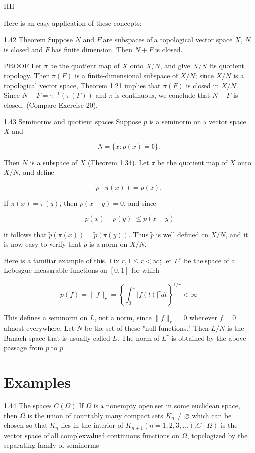 \documentclass[10pt]{article}
\begin{document}
IIII

Here is-an easy application of these concepts:

1.42 Theorem Suppose $N$ and $F$ are subspaces of a topological vector space $X$, $N$ is closed and $F$ has finite dimension. Then $N+F$ is closed.

PROOF Let $\pi$ be the quotient map of $X$ onto $X / N$, and give $X / N$ its quotient topology. Then $\pi(F)$ is a finite-dimensional subspace of $X / N$; since $X / N$ is a topological vector space, Theorem 1.21 implies that $\pi(F)$ is closed in $X / N$. Since $N+F=\pi^{-1}(\pi(F))$ and $\pi$ is continuous, we conclude that $N+F$ is closed. (Compare Exercise 20).

1.43 Seminorms and quotient spaces Suppose $p$ is a seminorm on a vector space $X$ and

$$
N=\{x: p(x)=0\} .
$$

Then $N$ is a subspace of $X$ (Theorem 1.34). Let $\pi$ be the quotient map of $X$ onto $X / N$, and define

$$
\tilde{p}(\pi(x))=p(x) .
$$

If $\pi(x)=\pi(y)$, then $p(x-y)=0$, and since

$$
|p(x)-p(y)| \leq p(x-y)
$$

it follows that $\tilde{p}(\pi(x))=\tilde{p}(\pi(y))$. Thus $\tilde{p}$ is well defined on $X / N$, and it is now easy to verify that $\tilde{p}$ is a norm on $X / N$.

Here is a familiar example of this. Fix $r, 1 \leq r<\infty$; let $L^{r}$ be the space of all Lebesgue measurable functions on $[0,1]$ for which

$$
p(f)=\|f\|_{r}=\left\{\int_{0}^{1}|f(t)|^{r} d t\right\}^{1 / r}<\infty
$$

This defines a seminorm on $L$, not a norm, since $\|f\|_{r}=0$ whenever $f=0$ almost everywhere. Let $N$ be the set of these "null functions." Then $L / N$ is the Banach space that is usually called $L$. The norm of $L^{r}$ is obtained by the above passage from $p$ to $\tilde{p}$.

\section{Examples}
1.44 The spaces $C(\Omega)$ If $\Omega$ is a nonempty open set in some euclidean space, then $\Omega$ is the union of countably many compact sets $K_{n} \neq \varnothing$ which can be chosen so that $K_{n}$ lies in the interior of $K_{n+1}(n=1,2,3, \ldots) . C(\Omega)$ is the vector space of all complexvalued continuous functions on $\Omega$, topologized by the separating family of seminorms
\end{document}
